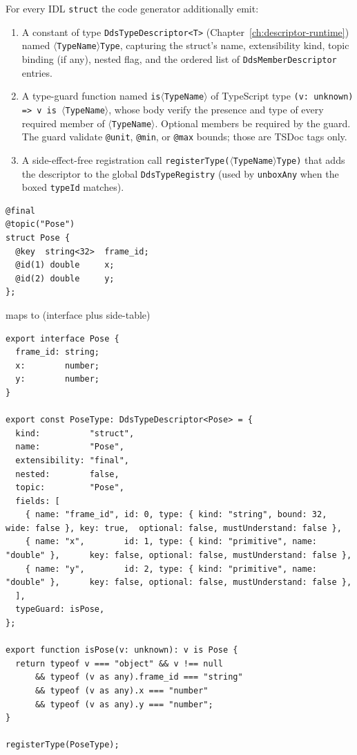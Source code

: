 \documentclass{../styles/zerodds-vendor-spec}
\begin{document}
For every IDL \texttt{struct} the code generator 
additionally emit:

\begin{enumerate}
  \item A constant of type \texttt{DdsTypeDescriptor<T>}
        (Chapter~\ref{ch:descriptor-runtime}) named
        \texttt{$\langle$TypeName$\rangle$Type}, capturing the
        struct's name, extensibility kind, topic binding (if any),
        nested flag, and the ordered list of
        \texttt{DdsMemberDescriptor} entries.
  \item A type-guard function named
        \texttt{is$\langle$TypeName$\rangle$} of TypeScript type
        \texttt{(v: unknown) => v is $\langle$TypeName$\rangle$},
        whose body  verify the presence and type of
        every required member of \texttt{$\langle$TypeName$\rangle$}.
        Optional members  be required by the
        guard. The guard  validate
        \texttt{@unit}, \texttt{@min}, or \texttt{@max} bounds;
        those are TSDoc tags only.
  \item A side-effect-free registration call
        \texttt{registerType($\langle$TypeName$\rangle$Type)} that
        adds the descriptor to the global
        \texttt{DdsTypeRegistry} (used by \texttt{unboxAny} when
        the boxed \texttt{typeId} matches).
\end{enumerate}

\begin{specexample}
\begin{lstlisting}
@final
@topic("Pose")
struct Pose {
  @key  string<32>  frame_id;
  @id(1) double     x;
  @id(2) double     y;
};
\end{lstlisting}
maps to (interface plus side-table)
\begin{lstlisting}
export interface Pose {
  frame_id: string;
  x:        number;
  y:        number;
}

export const PoseType: DdsTypeDescriptor<Pose> = {
  kind:          "struct",
  name:          "Pose",
  extensibility: "final",
  nested:        false,
  topic:         "Pose",
  fields: [
    { name: "frame_id", id: 0, type: { kind: "string", bound: 32, wide: false }, key: true,  optional: false, mustUnderstand: false },
    { name: "x",        id: 1, type: { kind: "primitive", name: "double" },      key: false, optional: false, mustUnderstand: false },
    { name: "y",        id: 2, type: { kind: "primitive", name: "double" },      key: false, optional: false, mustUnderstand: false },
  ],
  typeGuard: isPose,
};

export function isPose(v: unknown): v is Pose {
  return typeof v === "object" && v !== null
      && typeof (v as any).frame_id === "string"
      && typeof (v as any).x === "number"
      && typeof (v as any).y === "number";
}

registerType(PoseType);
\end{lstlisting}
\end{specexample}
\end{document}
